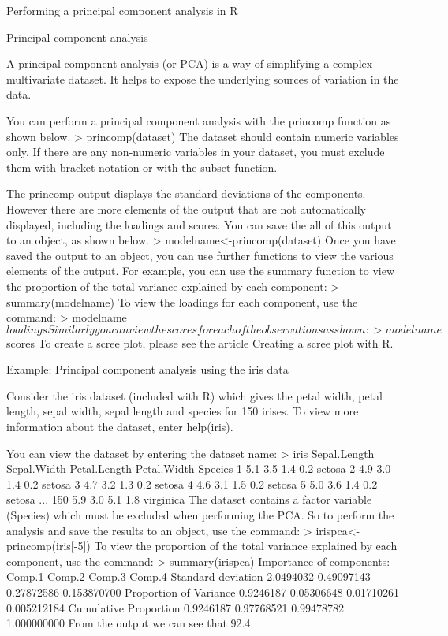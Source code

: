 
Performing a principal component analysis in R 


Principal component analysis
 
A principal component analysis (or PCA) is a way of simplifying a complex multivariate dataset. It helps to expose the underlying sources of variation in the data.
 
You can perform a principal component analysis with the princomp function as shown below. 
> princomp(dataset) 
The dataset should contain numeric variables only. If there are any non-numeric variables in your dataset, you must exclude them with bracket notation or with the subset function.
 
The princomp output displays the standard deviations of the components. However there are more elements of the output that are not automatically displayed, including the loadings and scores. You can save the all of this output to an object, as shown below.
 > modelname<-princomp(dataset) 
Once you have saved the output to an object, you can use further functions to view the various elements of the output. For example, you can use the summary function to view the proportion of the total variance explained by each component:
 > summary(modelname) 
To view the loadings for each component, use the command:
 > modelname$loadings 
Similarly you can view the scores for each of the observations as shown:
 > modelname$scores 
To create a scree plot, please see the article Creating a scree plot with R.
 
Example: Principal component analysis using the iris data
 
Consider the iris dataset (included with R) which gives the petal width, petal length, sepal width, sepal length and species for 150 irises. To view more information about the dataset, enter help(iris).
 
You can view the dataset by entering the dataset name:
 > iris     Sepal.Length Sepal.Width Petal.Length Petal.Width    Species
1            5.1         3.5          1.4         0.2     setosa
2            4.9         3.0          1.4         0.2     setosa
3            4.7         3.2          1.3         0.2     setosa
4            4.6         3.1          1.5         0.2     setosa
5            5.0         3.6          1.4         0.2     setosa
...
150          5.9         3.0          5.1         1.8  virginica 
The dataset contains a factor variable (Species) which must be excluded when performing the PCA. So to perform the analysis and save the results to an object, use the command:
 > irispca<-princomp(iris[-5]) 
To view the proportion of the total variance explained by each component, use the command:
 > summary(irispca) Importance of components:
                          Comp.1     Comp.2     Comp.3      Comp.4
Standard deviation     2.0494032 0.49097143 0.27872586 0.153870700
Proportion of Variance 0.9246187 0.05306648 0.01710261 0.005212184
Cumulative Proportion  0.9246187 0.97768521 0.99478782 1.000000000 
From the output we can see that 92.4%
 
